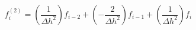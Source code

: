 \begin{equation} 
f^{{(2)}}_{i} = \left(\frac{1}{{\Delta h}^{2}}\right)f_{{i-2}}+ \left(- \frac{2}{{\Delta h}^{2}}\right)f_{{i-1}}+ \left(\frac{1}{{\Delta h}^{2}}\right)f_{{i}}
 \end{equation} 
